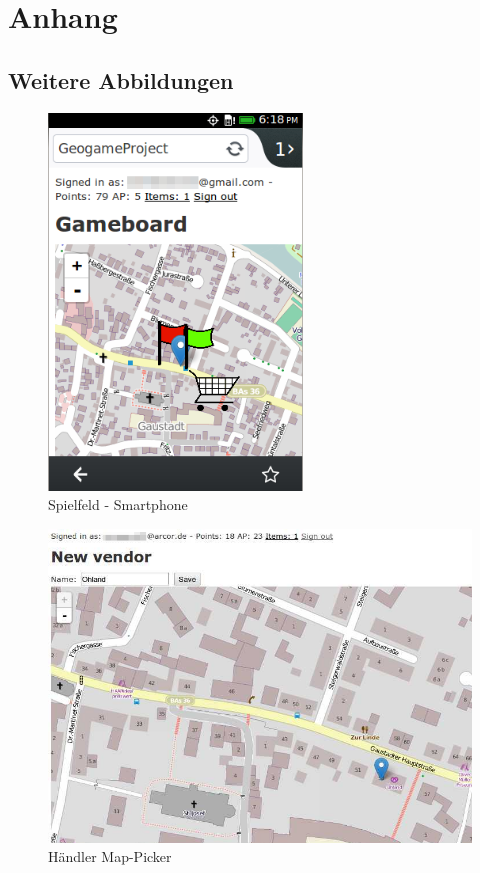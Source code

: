 \chapter{Anhang}
\section{Weitere Abbildungen}

\begin{figure}[H]
\begin{center}
\includegraphics[height=100mm]{images/ch8_firefoxos.png}
\caption{Spielfeld - Smartphone}
\label{img:ch8_firefoxos}
\end{center}
\end{figure}

\begin{figure}[H]
\begin{center}
\includegraphics[width=150mm]{images/ch8_vendor_mappick.png}
\caption{Händler Map-Picker}
\label{img:ch8_vendor_mappick}
\end{center}
\end{figure}

